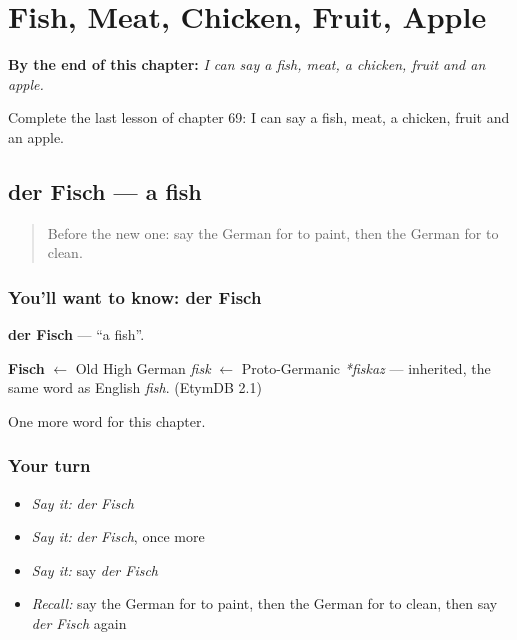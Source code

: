 
\chapter{Fish, Meat, Chicken, Fruit, Apple}
\label{ch:ge-fish-meat-chicken-fruit-apple}

\begin{chapteropening}
\textbf{By the end of this chapter:} \emph{I can say a fish, meat, a chicken, fruit and an apple.}

Complete the last lesson of chapter 69: I can say a fish, meat, a chicken, fruit and an apple.
\end{chapteropening}

\section[der Fisch]{der Fisch — a fish}

\label{lesson:GE-C69-fisch}



\begin{quote}
Before the new one: say the German for to paint, then the German for to clean.
\end{quote}

\subsection*{You'll want to know: der Fisch}
\textbf{der Fisch} — \textquotedblleft{}a fish\textquotedblright{}.

\begin{cousinweb}
\textbf{Fisch} $\leftarrow$ Old High German \emph{fisk} $\leftarrow$ Proto-Germanic \emph{*fiskaz} — inherited, the same word as English \emph{fish}. (EtymDB 2.1)
\end{cousinweb}

\begin{grammarlens}[title={What you've built}]
One more word for this chapter.
\end{grammarlens}

\subsection*{Your turn}
\begin{itemize}
\raggedright
  \item \emph{Say it:} \emph{der Fisch}
  \item \emph{Say it:} \emph{der Fisch}, once more
  \item \emph{Say it:} say \emph{der Fisch}
  \item \emph{Recall:} say the German for to paint, then the German for to clean, then say \emph{der Fisch} again
\end{itemize}

